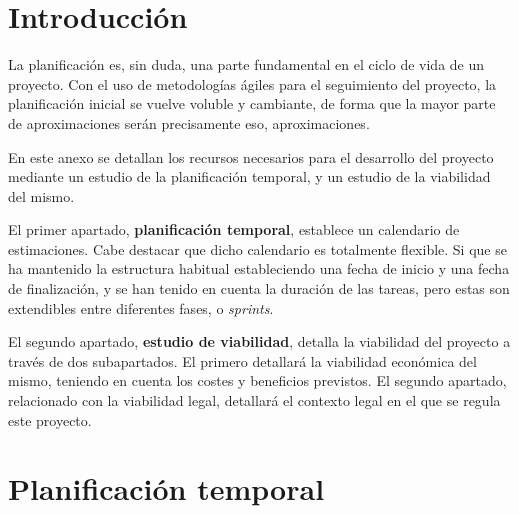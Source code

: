 
\section{Introducción}

La planificación es, sin duda, una parte fundamental en el ciclo de vida de un proyecto. 
Con el uso de metodologías ágiles para el seguimiento del proyecto, la planificación inicial se vuelve voluble y cambiante, de forma que la mayor parte de aproximaciones serán precisamente eso, aproximaciones.

En este anexo se detallan los recursos necesarios para el desarrollo del proyecto mediante un estudio de la planificación temporal, y un estudio de la viabilidad del mismo. 

El primer apartado, \textbf{planificación temporal}, establece un calendario de estimaciones. Cabe destacar que dicho calendario es totalmente flexible. Si que se ha mantenido la estructura habitual estableciendo una fecha de inicio y una fecha de finalización, y se han tenido en cuenta la duración de las tareas, pero estas son extendibles entre diferentes fases, o \emph{sprints}.

El segundo apartado, \textbf{estudio de viabilidad}, detalla la viabilidad del proyecto a través de dos subapartados. El primero detallará la viabilidad económica del mismo, teniendo en cuenta los costes y beneficios previstos. El segundo apartado, relacionado con la viabilidad legal, detallará el contexto legal en el que se regula este proyecto. 

\newpage

\section{Planificación temporal}

